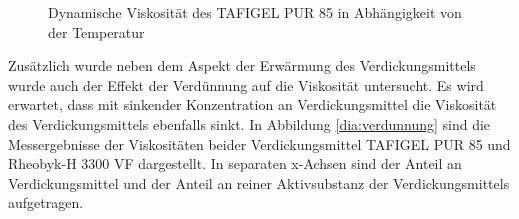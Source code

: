 \begin{figure}[h]
	\begin{center}
		\caption{Dynamische Viskosität des TAFIGEL PUR 85 in Abhängigkeit von der Temperatur}
		\label{dia:temp}
	\end{center}
\end{figure} 
\FloatBarrier 
Zusätzlich wurde neben dem Aspekt der Erwärmung des Verdickungsmittels wurde auch der Effekt der Verdünnung auf die Viskosität untersucht. Es wird erwartet, dass mit sinkender Konzentration an Verdickungsmittel die Viskosität des Verdickungsmittels ebenfalls sinkt. In Abbildung \ref{dia:verdunnung} sind die Messergebnisse der Viskositäten beider Verdickungsmittel TAFIGEL PUR 85 und Rheobyk-H 3300 VF dargestellt. In separaten x-Achsen sind der Anteil an Verdickungsmittel und der Anteil an reiner Aktivsubstanz der Verdickungsmittels aufgetragen.



